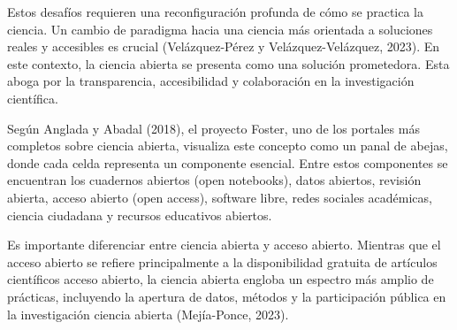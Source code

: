 \documentclass[
  latterpaper,
  DIV=11,
  numbers=noendperiod]{scrartcl}
\begin{document}
\begin{tcolorbox}[enhanced jigsaw, colframe=quarto-callout-warning-color-frame, toprule=.15mm, colbacktitle=quarto-callout-warning-color!10!white, coltitle=black, bottomtitle=1mm, opacityback=0, toptitle=1mm, rightrule=.15mm, arc=.35mm, title=\textcolor{quarto-callout-warning-color}{\faExclamationTriangle}\hspace{0.5em}{Advertencia}, titlerule=0mm, breakable, colback=white, leftrule=.75mm, bottomrule=.15mm, left=2mm, opacitybacktitle=0.6]

Estos desafíos requieren una reconfiguración profunda de cómo se
practica la ciencia. Un cambio de paradigma hacia una ciencia más
orientada a soluciones reales y accesibles es crucial (Velázquez-Pérez y
Velázquez-Velázquez, 2023). En este contexto, la ciencia abierta se
presenta como una solución prometedora. Esta aboga por la transparencia,
accesibilidad y colaboración en la investigación científica.

\end{tcolorbox}

\begin{tcolorbox}[enhanced jigsaw, colframe=quarto-callout-important-color-frame, toprule=.15mm, colbacktitle=quarto-callout-important-color!10!white, coltitle=black, bottomtitle=1mm, opacityback=0, toptitle=1mm, rightrule=.15mm, arc=.35mm, title=\textcolor{quarto-callout-important-color}{\faExclamation}\hspace{0.5em}{Importante}, titlerule=0mm, breakable, colback=white, leftrule=.75mm, bottomrule=.15mm, left=2mm, opacitybacktitle=0.6]

Según Anglada y Abadal (2018), el proyecto Foster, uno de los portales
más completos sobre ciencia abierta, visualiza este concepto como un
panal de abejas, donde cada celda representa un componente esencial.
Entre estos componentes se encuentran los cuadernos abiertos (open
notebooks), datos abiertos, revisión abierta, acceso abierto (open
access), software libre, redes sociales académicas, ciencia ciudadana y
recursos educativos abiertos.

Es importante diferenciar entre ciencia abierta y acceso abierto.
Mientras que el acceso abierto se refiere principalmente a la
disponibilidad gratuita de artículos científicos acceso abierto, la
ciencia abierta engloba un espectro más amplio de prácticas, incluyendo
la apertura de datos, métodos y la participación pública en la
investigación ciencia abierta (Mejía-Ponce, 2023).

\end{tcolorbox}
\end{document}
